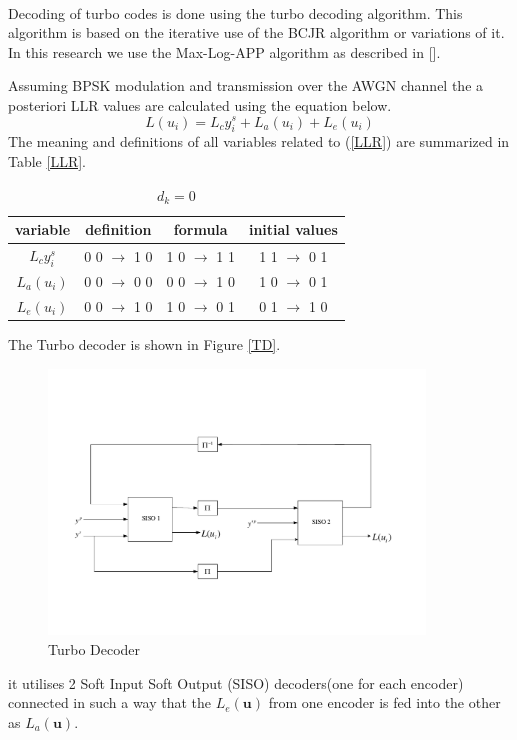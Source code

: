 \documentclass[20 pts]{article}
\begin{document}
\paragraph{}
Decoding of turbo codes is done using the turbo decoding algorithm. This algorithm
is based on the iterative use of the BCJR algorithm or variations of it. 
In this research we
use the Max-Log-APP algorithm as described in [].

Assuming BPSK modulation and transmission over the AWGN channel
the a posteriori LLR values are calculated using the equation below.
\begin{equation}
L(u_i)=L_cy^s_i + L_a (u_i) + L_e(u_i)
\label{LLR}
\end{equation}
The meaning and definitions of all variables related to (\ref{LLR}) are summarized in
Table \ref{LLR}.

\begin{table}[h!]
\begin{center}
 \begin{tabular}{|| c | c | c | c ||} 
 
 \hline
 variable & definition & formula & initial values  \\ [0.5ex] 
 \hline\hline
 $L_cy^s_i$ & 0 0 $\rightarrow$ 1 0 & 1 0 $\rightarrow$ 1 1 & 1 1 $\rightarrow$ 0 1  \\ 
 \hline
 $L_a (u_i)$  & 0 0 $\rightarrow$ 0 0 & 0 0 $\rightarrow$ 1 0 & 1 0 $\rightarrow$ 0 1  \\ 
 \hline
  $L_e(u_i)$& 0 0 $\rightarrow$ 1 0 & 1 0 $\rightarrow$ 0 1 & 0 1 $\rightarrow$ 1 0  \\ [1ex] 
 \hline
 
\end{tabular}
\label{T1}
\end{center}
\label{T1}
\caption{$d_k = 0$}
\end{table}

The Turbo decoder is shown in Figure \ref{TD}.
\begin{figure}[h!]
\includegraphics[width=10cm]{D1.pdf}
\caption{Turbo Decoder}
\label{TD}
\label{図2}
\end{figure}
it utilises 2 Soft Input Soft Output (SISO) decoders(one for each encoder) 
connected in such
a way that the $L_e(\mathbf{u})$ from one encoder is fed into the other as
 $L_a(\mathbf{u})$.
\end{document}

